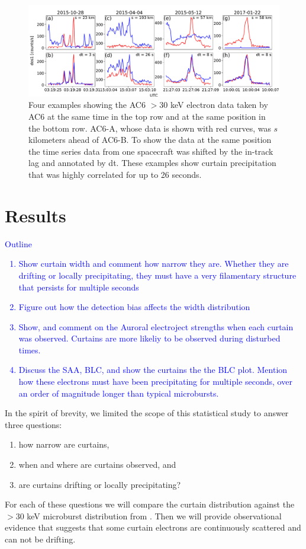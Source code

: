 \documentclass[draft]{agujournal2019}
\begin{document}
\begin{figure}
\includegraphics[width=\textwidth]{fig1.pdf}
\caption{Four examples showing the AC6 $> 30$ keV electron data taken by AC6 at the same time in the top row and at the same position in the bottom row. AC6-A, whose data is shown with red curves, was $s$ kilometers ahead of AC6-B. To show the data at the same position the time series data from one spacecraft was shifted by the in-track lag and annotated by dt. These examples show curtain precipitation that was highly correlated for up to 26 seconds.}
\label{fig1}
\end{figure}

\section{Results} \label{results}
\textcolor{blue}{
Outline
\begin{enumerate}
\item Show curtain width and comment how narrow they are. Whether they are drifting or locally precipitating, they must have a very filamentary structure that persists for multiple seconds
\item Figure out how the detection bias affects the width distribution
\item Show, and comment on the Auroral electroject strengths when each curtain was observed. Curtains are more likeliy to be observed during disturbed times.
\item Discuss the SAA, BLC, and show the curtains the the BLC plot. Mention how these electrons must have been precipitating for multiple seconds, over an order of magnitude longer than typical microbursts.
\end{enumerate}
}

In the spirit of brevity, we limited the scope of this statistical study to answer three questions:

\begin{enumerate}
\item how narrow are curtains,
\item when and where are curtains observed, and
\item are curtains drifting or locally precipitating?
\end{enumerate} For each of these questions we will compare the curtain distribution against the $>30$ keV microburst distribution from . Then we will provide observational evidence that suggests that some curtain electrons are continuously scattered and can not be drifting.
\end{document}
